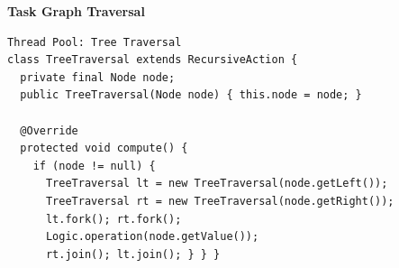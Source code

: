 \textbf{Task Graph Traversal}
\begin{lstlisting}[style=csharp]
Thread Pool: Tree Traversal
class TreeTraversal extends RecursiveAction {
  private final Node node;
  public TreeTraversal(Node node) { this.node = node; }
  
  @Override
  protected void compute() {
    if (node != null) {
      TreeTraversal lt = new TreeTraversal(node.getLeft());
      TreeTraversal rt = new TreeTraversal(node.getRight());
      lt.fork(); rt.fork(); 
      Logic.operation(node.getValue());
      rt.join(); lt.join(); } } }
\end{lstlisting}